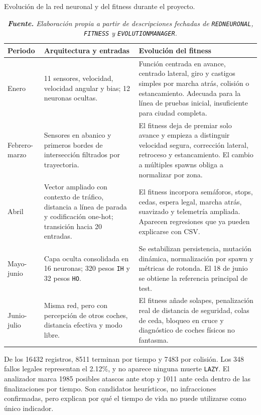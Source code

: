 \begin{table}[H]
\centering
\caption{Evolución de la red neuronal y del fitness durante el proyecto.}%
\label{tab:evolucion-red-fitness}
\begin{tabularx}{0.96\textwidth}{L{2.5cm}L{3.6cm}X}
\toprule
\textbf{Periodo} & \textbf{Arquitectura y entradas} & \textbf{Evolución del fitness}\\
\midrule
Enero & 11 sensores, velocidad, velocidad angular y bias; 12 neuronas ocultas. & Función centrada en avance, centrado lateral, giro y castigos simples por marcha atrás, colisión o estancamiento. Adecuada para la línea de pruebas inicial, insuficiente para ciudad completa.\\
Febrero-marzo & Sensores en abanico y primeros bordes de intersección filtrados por trayectoria. & El fitness deja de premiar solo avance y empieza a distinguir velocidad segura, corrección lateral, retroceso y estancamiento. El cambio a múltiples spawns obliga a normalizar por zona.\\
Abril & Vector ampliado con contexto de tráfico, distancia a línea de parada y codificación one-hot; transición hacia 20 entradas. & El fitness incorpora semáforos, stops, cedas, espera legal, marcha atrás, suavizado y telemetría ampliada. Aparecen regresiones que ya pueden explicarse con CSV.\\
Mayo-junio & Capa oculta consolidada en 16 neuronas; 320 pesos \texttt{IH} y 32 pesos \texttt{HO}. & Se estabilizan persistencia, mutación dinámica, normalización por spawn y métricas de rotonda. El 18 de junio se obtiene la referencia principal de test.\\
Junio-julio & Misma red, pero con percepción de otros coches, distancia efectiva y modo libre. & El fitness añade solapes, penalización real de distancia de seguridad, colas de ceda, bloqueo en cruce y diagnóstico de coches físicos no fantasma.\\
\bottomrule
\end{tabularx}
\caption*{\textit{\textbf{Fuente.} Elaboración propia a partir de descripciones fechadas de \texttt{REDNEURONAL}, \texttt{FITNESS} y \texttt{EVOLUTIONMANAGER}.}}
\end{table}

De los 16432 registros, 8511 terminan por tiempo y 7483 por colisión. Los 348 fallos legales representan el 2.12\%, y no aparece ninguna muerte \texttt{LAZY}. El analizador marca 1985 posibles atascos ante stop y 1011 ante ceda dentro de las finalizaciones por tiempo. Son candidatos heurísticos, no infracciones confirmadas, pero explican por qué el tiempo de vida no puede utilizarse como único indicador.

